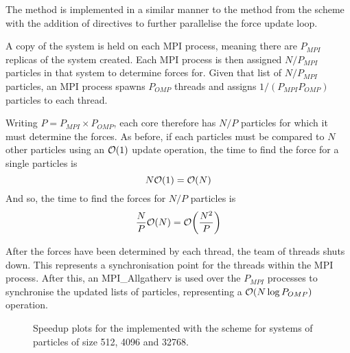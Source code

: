 The \pairoperation{} method is implemented in a similar manner to the
\pairoperation{} method from the \replicateddata{} scheme with the
addition of \openmp{} directives to further parallelise the
force update loop.

A copy of the system is held on each MPI process, meaning there
are $P_{MPI}$ replicas of the system created.
%
Each MPI process is then assigned $N/P_{MPI}$ particles in that system
to determine forces for.
%
Given that list of $N/P_{MPI}$ particles,
an MPI process spawns $P_{OMP}$ threads
and assigns $1/(P_{MPI} P_{OMP})$ particles to each thread.

Writing $P = P_{MPI} \times{} P_{OMP}$,
each core therefore has $N/P$ particles
for which it must determine the forces.
%
As before, if each particles must be compared to $N$ other particles
using an $\mathcal{O}{\left({ 1 }\right)}$ update operation, the time to find the force for
a single particles is
\begin{equation}
    N\mathcal{O}{\left({ 1 }\right)} = \mathcal{O}{\left({ N }\right)}
\end{equation}
And so, the time to find the forces for $N/P$ particles is
\begin{equation}
    \frac{N}{P}\mathcal{O}{\left({ N }\right)} = \mathcal{O}{\left({ \frac{N^2}{P} }\right)}
\end{equation}

After the forces have been determined by each thread, the team of threads
shuts down.
%
This represents a synchronisation point for the threads within the
MPI process.
%
After this, an MPI\_Allgatherv is used over the $P_{MPI}$ processes
to synchronise the updated lists of particles, representing a
$\mathcal{O}{\left({ N\log{P_{OMP}} }\right)}$ operation.

%
%
\begin{figure}[!h]
    
    \caption{
        Speedup plots for the \pairoperation{} implemented with the \sharedandreplicateddata{} scheme for systems of particles of size 512, 4096 and 32768.
    }
    \label{fig:v1_shared_and_replicated_data_pair_operation_speedups}
\end{figure}


%
%
\begin{figure}[!h]
    
    \caption{}
    \label{fig:v1_shared_and_replicated_pair_operation_512_logtime}
\end  {figure}

